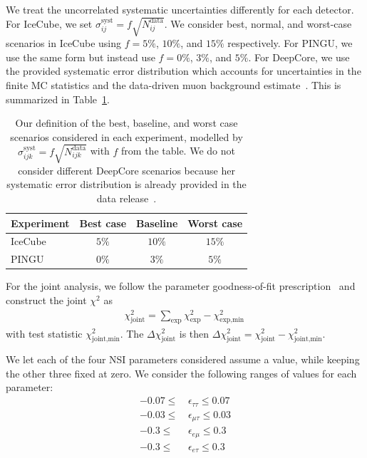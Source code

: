 \documentclass{article}
\newcommand{\emt}{\ensuremath{\epsilon_{\mu\tau}}}
\newcommand{\eet}{\epsilon_{e\tau}}
\newcommand{\eem}{\epsilon_{e\mu}}
\newcommand{\ett}{\ensuremath{\epsilon_{\tau\tau}}}
\begin{document}
We treat the uncorrelated systematic uncertainties differently for each detector. For IceCube, we set $\sigma_{ij}^\text{syst} = f\sqrt{N_{ij}^\text{data}}$.
We consider best, normal, and worst-case scenarios in IceCube using
$f=5\%$, $10\%$, and $15\%$ respectively. For PINGU, we use the same form but instead use $f=0\%$, $3\%$, and $5\%$.
For DeepCore, we use the provided systematic error distribution which accounts for uncertainties in the finite MC statistics and the data-driven 
muon background estimate~\cite{DC2019data}. This is summarized in Table~\ref{table:syst_errors}.
{\renewcommand{\arraystretch}{1.2}
\begin{table}
   \centering
   \begin{tabular}{lccc}
      \hline \hline
      Experiment & Best case & Baseline & Worst case \\
      \hline
      IceCube & $5\%$ & $10\%$ & $15\%$ \\
      PINGU & $0\%$ & $3\%$ & $5\%$ \\
      \hline \hline
   \end{tabular}
   \caption{Our definition of the best, baseline, and worst case scenarios considered in each experiment, modelled by $\sigma_{ijk}^\text{syst} = f\sqrt{N_{ijk}^\text{data}}$ with $f$ from the table.
   We do not consider different DeepCore scenarios because her systematic error distribution is already provided in the data release~\cite{DC2019data}.}\label{table:syst_errors}
\end{table}

For the joint analysis, we follow the parameter goodness-of-fit prescription~\cite{maltoni2003} and construct the joint $\chi^2$ as 
\begin{align}\label{eq:joint_chisq}
    \chi^2_\text{joint} = \sum_\text{exp}\chi^2_\text{exp} - \chi^2_\text{exp,min}\,
\end{align}
with test statistic $\chi^2_\text{joint,min}$. The $\Delta \chi^2_\text{joint}$ is then $\Delta \chi^2_\text{joint} = \chi^2_\text{joint} - \chi^2_\text{joint,min}$.

We let each of the four NSI parameters considered assume a value, while keeping the other three fixed at zero. We consider the following ranges of values for each parameter:
\begin{align}
   -0.07 \le &\, \ett \le 0.07 \nonumber \\
   -0.03 \le &\, \emt \le 0.03 \nonumber \\
   -0.3 \le &\, \eem \le 0.3 \nonumber \\
   -0.3 \le &\, \eet \le 0.3 \nonumber \\
\end{align}

}
\end{document}
